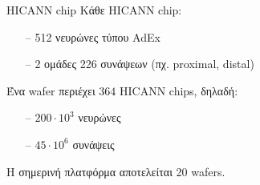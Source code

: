 \documentclass[11pt,center]{beamer}
\begin{document}
	\begin{frame} {HICANN chip}
		Κάθε HICANN chip:
		\begin{itemize}
			\item[--] 512 νευρώνες τύπου AdEx
			\item[--] 2 ομάδες 226 συνάψεων (πχ. proximal, distal)
		\end{itemize}
		\pause
		\vfill
		Ένα wafer περιέχει $364$ HICANN chips, δηλαδή:
		\begin{itemize}
			\item[--] $200\cdot 10^3$ νευρώνες
			\item[--]$45\cdot 10^6$ συνάψεις
		\end{itemize}
		\pause
		\vfill
		Η σημερινή πλατφόρμα αποτελείται 20 wafers.
		
	\end{frame}
	
\end{document}
